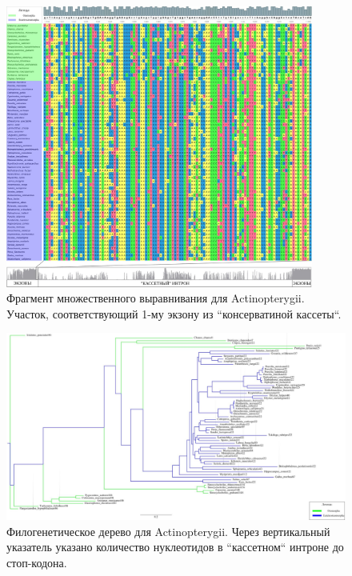 \begin{figure}[ht] %
    \centering
    \includegraphics[width=0.9\textwidth]{images/Actinopterygii_alignment_ruler}
    \caption{Фрагмент множественного выравнивания для Actinopterygii. Участок, соответствующий 1-му экзону из ``консерватиной кассеты``.}
    \label{fig:Actinopterygii_alignment_ruler}
\end{figure}

\begin{figure}[hb] %
    \centering
    \includegraphics[width=1.0\textwidth]{images/Actinopterygii_tree}
    \caption{Филогенетическое дерево для Actinopterygii. Через вертикальный указатель указано количество нуклеотидов в ``кассетном`` интроне до стоп-кодона.}
    \label{fig:Actinopterygii_tree}
\end{figure}